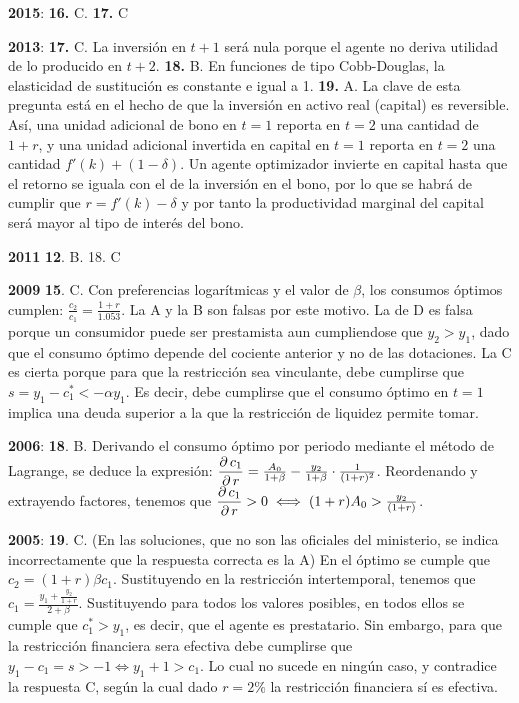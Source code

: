 \documentclass{nuevotema}
\begin{document}
\textbf{2015}: \textbf{16.} C. \textbf{17.} C

\textbf{2013}: \textbf{17.} C. La inversión en $t+1$ será nula porque el agente no deriva utilidad de lo producido en $t+2$. \textbf{18.} B. En funciones de tipo Cobb-Douglas, la elasticidad de sustitución es constante e igual a 1. \textbf{19.} A. La clave de esta pregunta está en el hecho de que la inversión en activo real (capital) es reversible. Así, una unidad adicional de bono en $t=1$ reporta en $t=2$ una cantidad de $1+r$, y una unidad adicional invertida en capital en $t=1$ reporta en $t=2$ una cantidad $f'(k) + (1-\delta)$. Un agente optimizador invierte en capital hasta que el retorno se iguala con el de la inversión en el bono, por lo que se habrá de cumplir que $r = f'(k) - \delta$ y por tanto la productividad marginal del capital será mayor al tipo de interés del bono.

\textbf{2011} \textbf{12}. B. 18. C

\textbf{2009} \textbf{15}. C. Con preferencias logarítmicas y el valor de $\beta$, los consumos óptimos cumplen: $\frac{c_2}{c_1} = \frac{1+r}{1.053}$. La A y la B son falsas por este motivo. La de D es falsa porque un consumidor puede ser prestamista aun cumpliendose que $y_2 > y_1$, dado que el consumo óptimo depende del cociente anterior y no de las dotaciones. La C es cierta porque para que la restricción sea vinculante, debe cumplirse que $s = y_1 - c_1^* < -\alpha y_1$. Es decir, debe cumplirse que el consumo óptimo en $t=1$ implica una deuda superior a la que la restricción de liquidez permite tomar.

\textbf{2006}: \textbf{18}. B. Derivando el consumo óptimo por periodo mediante el método de Lagrange, se deduce la expresión: $\dfrac{\partial \, c_1}{\partial \, r} = \frac{A_0}{1+\beta} - \frac{y_2}{1+\beta}\cdot \frac{1}{(1+r)^2}$. Reordenando y extrayendo factores, tenemos que $\dfrac{\partial \, c_1}{\partial \, r} > 0 \iff (1+r)A_0 > \frac{y_2}{(1+r)}$.

\textbf{2005}: \textbf{19}. C. (En las soluciones, que no son las oficiales del ministerio, se indica incorrectamente que la respuesta correcta es la A) En el óptimo se cumple que $c_2 = (1+r) \beta c_1$. Sustituyendo en la restricción intertemporal, tenemos que $c_ 1 = \frac{ y_1 + \frac{y_2}{1+r}}{2+ \beta}$. Sustituyendo para todos los valores posibles, en todos ellos se cumple que $c_1^* > y_1$, es decir, que el agente es prestatario. Sin embargo, para que la restricción financiera sera efectiva debe cumplirse que $y_1 - c_1 = s > -1 \iff y_1+1>c_1$. Lo cual no sucede en ningún caso, y contradice la respuesta C, según la cual dado $r=2\%$ la restricción financiera sí es efectiva.
\end{document}
